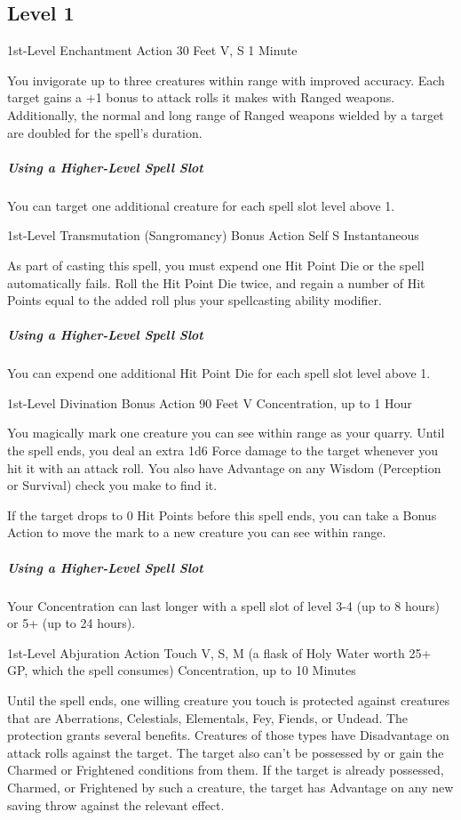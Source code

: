 \documentclass[letterpaper,openany,oneside,twocolumn]{book}
\begin{document}
\subsection*{Level 1}

	{1st-Level Enchantment}
	{Action}
	{30 Feet}
	{V, S}
	{1 Minute}

You invigorate up to three creatures within range with improved accuracy. Each target gains a +1 bonus to attack rolls it makes with Ranged weapons. Additionally, the normal and long range of Ranged weapons wielded by a target are doubled for the spell's duration.

\subparagraph*{Using a Higher-Level Spell Slot} You can target one additional creature for each spell slot level above 1.

	{1st-Level Transmutation (Sangromancy)}
	{Bonus Action}
	{Self}
	{S}
	{Instantaneous}

As part of casting this spell, you must expend one Hit Point Die or the spell automatically fails. Roll the Hit Point Die twice, and regain a number of Hit Points equal to the added roll plus your spellcasting ability modifier.

\subparagraph*{Using a Higher-Level Spell Slot} You can expend one additional Hit Point Die for each spell slot level above 1.

	{1st-Level Divination}
	{Bonus Action}
	{90 Feet}
	{V}
	{Concentration, up to 1 Hour}

You magically mark one creature you can see within range as your quarry. Until the spell ends, you deal an extra 1d6 Force damage to the target whenever you hit it with an attack roll. You also have Advantage on any Wisdom (Perception or Survival) check you make to find it.

If the target drops to 0 Hit Points before this spell ends, you can take a Bonus Action to move the mark to a new creature you can see within range.

\subparagraph*{Using a Higher-Level Spell Slot} Your Concentration can last longer with a spell slot of level 3-4 (up to 8 hours) or 5+ (up to 24 hours).

	{1st-Level Abjuration}
	{Action}
	{Touch}
	{V, S, M (a flask of Holy Water worth 25+ GP, which the spell consumes)}
	{Concentration, up to 10 Minutes}

Until the spell ends, one willing creature you touch is protected against creatures that are Aberrations, Celestials, Elementals, Fey, Fiends, or Undead. The protection grants several benefits. Creatures of those types have Disadvantage on attack rolls against the target. The target also can't be possessed by or gain the Charmed or Frightened conditions from them. If the target is already possessed, Charmed, or Frightened by such a creature, the target has Advantage on any new saving throw against the relevant effect.
\end{document}
